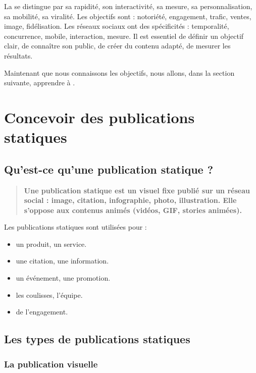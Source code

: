 La  se distingue par sa rapidité, son interactivité, sa mesure, sa personnalisation, sa mobilité, sa viralité. Les objectifs sont : notoriété, engagement, trafic, ventes, image, fidélisation. Les réseaux sociaux ont des spécificités : temporalité, concurrence, mobile, interaction, mesure. Il est essentiel de définir un objectif clair, de connaître son public, de créer du contenu adapté, de mesurer les résultats.

Maintenant que nous connaissons les objectifs, nous allons, dans la section suivante, apprendre à .

\section{Concevoir des publications statiques}

\subsection{Qu'est-ce qu'une publication statique ?}

\begin{quote}
\textbf{Une publication statique est un visuel fixe publié sur un réseau social : image, citation, infographie, photo, illustration. Elle s'oppose aux contenus animés (vidéos, GIF, stories animées).}
\end{quote}

Les publications statiques sont utilisées pour :

\begin{itemize}
    \item {} un produit, un service.
    \item {} une citation, une information.
    \item {} un événement, une promotion.
    \item {} les coulisses, l'équipe.
    \item {} de l'engagement.
\end{itemize}

\subsection{Les types de publications statiques}

\subsubsection{La publication visuelle}

